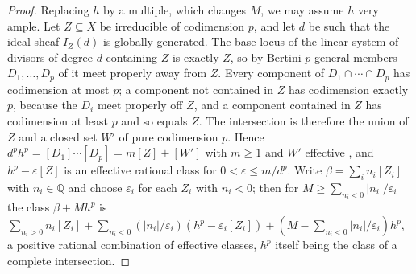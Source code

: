 \documentclass[11pt,reqno]{amsart}
\theoremstyle{plain}
\theoremstyle{definition}
\theoremstyle{remark}
\newcommand{\QQ}{\mathbb{Q}}
\begin{document}
\begin{proof}
Replacing $h$ by a multiple, which changes $M$, we may assume $h$ very ample.
Let $Z\subseteq X$ be irreducible of codimension $p$, and let $d$ be such that
the ideal sheaf $I_{Z}(d)$ is globally generated. The base locus of the linear
system of divisors of degree $d$ containing $Z$ is exactly $Z$, so by Bertini
$p$ general members $D_{1},\dots,D_{p}$ of it meet properly away from $Z$.
Every component of $D_{1}\cap\cdots\cap D_{p}$ has codimension at most $p$;
a component not contained in $Z$ has codimension exactly $p$, because the
$D_{i}$ meet properly off $Z$, and a component contained in $Z$ has
codimension at least $p$ and so equals $Z$. The intersection is therefore the
union of $Z$ and a closed set $W'$ of pure codimension $p$. Hence $d^{p}h^{p}=[D_{1}]\cdots[D_{p}]=m[Z]+[W']$ with $m\ge1$ and
$W'$ effective \cite[Chapter~7]{Ful98}, and $h^{p}-\varepsilon[Z]$ is an
effective rational class for $0<\varepsilon\le m/d^{p}$. Write
$\beta=\sum_{i}n_{i}[Z_{i}]$ with $n_{i}\in\QQ$ and choose $\varepsilon_{i}$ for
each $Z_{i}$ with $n_{i}<0$; then for $M\ge\sum_{n_{i}<0}|n_{i}|/\varepsilon_{i}$
the class $\beta+Mh^{p}$ is $\sum_{n_{i}>0}n_{i}[Z_{i}]+\sum_{n_{i}<0}
(|n_{i}|/\varepsilon_{i})(h^{p}-\varepsilon_{i}[Z_{i}])+(M-\sum_{n_{i}<0}
|n_{i}|/\varepsilon_{i})h^{p}$, a positive rational combination of effective
classes, $h^{p}$ itself being the class of a complete intersection.
\end{proof}
\end{document}
